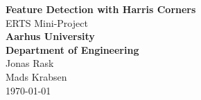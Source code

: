 \begin{titlepage}
    \begin{center}
        \vspace*{0cm}
        \Huge\textbf{Feature Detection with Harris Corners}\\
        \vspace{0.5cm}
        \huge{ERTS Mini-Project}\\
        \vspace{1.5cm}
        \Large\textbf{{Aarhus University\\ Department of Engineering}}\\
        \vspace{0.5cm}
        \Large{Jonas Rask\\Mads Krabsen}\\
        \vspace{0.5cm}
        \large{\today}
    \end{center}  
\end{titlepage}


